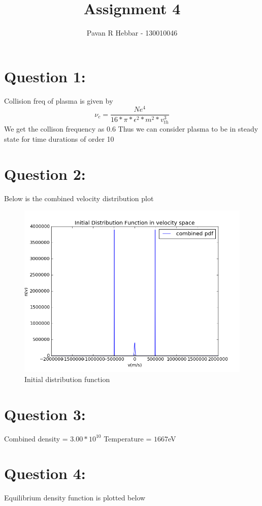 \documentclass[11pt, a4paper]{article}
\title{\textbf{Assignment 4}}
\author{Pavan R Hebbar - 130010046}
\begin{document}
\maketitle
\newpage
\section{Question 1:}

Collision freq of plasma is given by
\begin{equation}
 \nu_{c} = \frac{Ne^4}{16*\pi *\epsilon ^2*m^2*v_{th}^3}
\end{equation}
We get the collison frequency as 0.6
Thus we can consider plasma to be in steady state for time durations of order 10

\section{Question 2:}
Below is the combined velocity distribution plot
\begin{figure}[H]
 \centering
 \includegraphics[scale = 0.6]{Init_dist.png}
 \caption{Initial distribution function}
\end{figure}

\section{Question 3:}
Combined density = $3.00*10^10$
Temperature = $1667$eV

\section{Question 4:}
Equilibrium density function is plotted below
\end{document}
